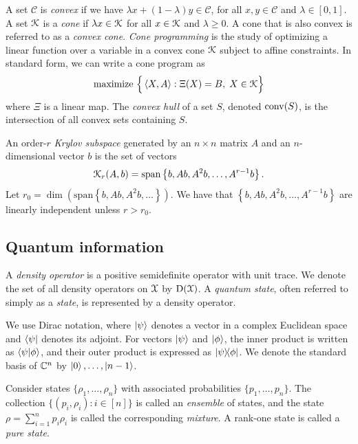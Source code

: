 A set $\mathcal{C}$ is \emph{convex} if we have $\lambda x + (1 - \lambda) y \in \mathcal{C}$, for all $x, y \in \mathcal{C}$ and $\lambda \in [0, 1]$.
A set $\mathcal{K}$ is a \emph{cone} if $\lambda x \in \mathcal{K}$ for all $x \in \mathcal{K}$ and $\lambda \geq 0$.
A cone that is also convex is referred to as a \emph{convex cone}.
\emph{Cone programming} is the study of optimizing a linear function over a variable in a convex cone $\mathcal{K}$ subject to affine constraints. 
In standard form, we can write a cone program as 
\begin{equation} 
    \text{maximize } \Big\{ \left\langle X, A \right\rangle : \Xi(X) = B, \; X \in \mathcal{K} \Big\} 
\end{equation} 
where $\Xi$ is a linear map.
The \emph{convex hull} of a set $S$, denoted $\mathrm{conv}(S)$, is the intersection of all convex sets containing $S$.

An order-$r$ \emph{Krylov subspace} generated by an $n \times n$ matrix $A$ and an $n$-dimensional vector $b$ is the set of vectors
\begin{equation*}
    \mathcal{K}_r(A, b) = \mathrm{span} \left\{ b, A b, A^2 b, \ldots, A^{r-1} b \right\}.
\end{equation*}
Let $r_0 = \dim (\mathrm{span} \left\{ b, A b, A^2 b, \ldots \right\})$.
We have that $\left\{ b, A b, A^2 b, \ldots, A^{r-1} b \right\}$ are linearly independent unless $r > r_0$.



\subsection{Quantum information}

A \emph{density operator} is a positive semidefinite operator with unit trace. 
We denote the set of all density operators on $\mathcal{X}$ by $\mathrm{D}(\mathcal{X})$. 
A \emph{quantum state}, often referred to simply as a \emph{state}, is represented by a density operator.

We use Dirac notation, where $\ket{\psi}$ denotes a vector in a complex Euclidean space and $\bra{\psi}$ denotes its adjoint. 
For vectors $\ket{\psi}$ and $\ket{\phi}$, the inner product is written as $\braket{\psi}{\phi}$, and their outer product is expressed as $\ketbra{\psi}{\phi}$.
We denote  the standard basis of $\mathbb{C}^n$ by $\ket{0}, \ldots, \ket{n-1}$.

Consider states $\{\rho_1, \ldots, \rho_n\}$ with associated probabilities $\{p_1, \ldots, p_n\}$. 
The collection $\{(p_i,\rho_i): i \in [n]\}$ is called an \emph{ensemble} of states, and the state $\rho = \sum_{i=1}^n p_i \rho_i$
is called the corresponding \emph{mixture}. 
A rank-one state is called a \emph{pure state}.

